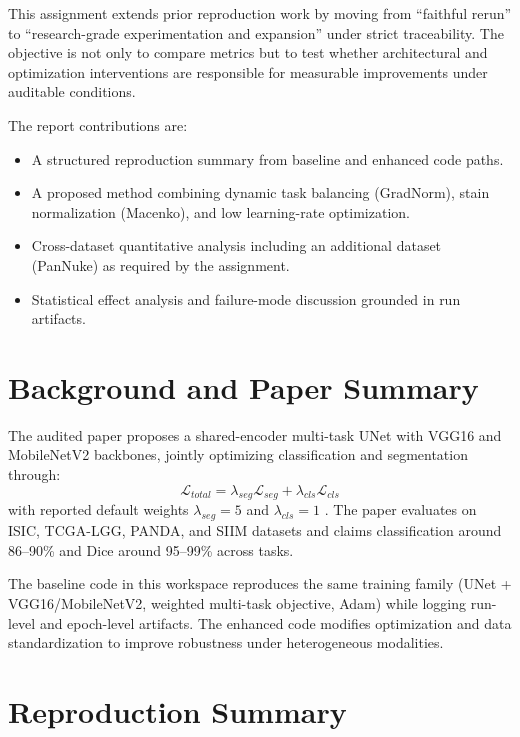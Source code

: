 \documentclass[conference]{IEEEtran}
\begin{document}
This assignment extends prior reproduction work by moving from ``faithful rerun'' to ``research-grade experimentation and expansion'' under strict traceability. The objective is not only to compare metrics but to test whether architectural and optimization interventions are responsible for measurable improvements under auditable conditions.

The report contributions are:
\begin{itemize}
\item A structured reproduction summary from baseline and enhanced code paths.
\item A proposed method combining dynamic task balancing (GradNorm), stain normalization (Macenko), and low learning-rate optimization.
\item Cross-dataset quantitative analysis including an additional dataset (PanNuke) as required by the assignment.
\item Statistical effect analysis and failure-mode discussion grounded in run artifacts.
\end{itemize}

\section{Background and Paper Summary}
The audited paper proposes a shared-encoder multi-task UNet with VGG16 and MobileNetV2 backbones, jointly optimizing classification and segmentation through:
\begin{equation}
\mathcal{L}_{total}=\lambda_{seg}\mathcal{L}_{seg}+\lambda_{cls}\mathcal{L}_{cls}
\end{equation}
with reported default weights $\lambda_{seg}=5$ and $\lambda_{cls}=1$ \cite{b3}. The paper evaluates on ISIC, TCGA-LGG, PANDA, and SIIM datasets and claims classification around 86--90\% and Dice around 95--99\% across tasks.

The baseline code in this workspace reproduces the same training family (UNet + VGG16/MobileNetV2, weighted multi-task objective, Adam) while logging run-level and epoch-level artifacts. The enhanced code modifies optimization and data standardization to improve robustness under heterogeneous modalities.

\section{Reproduction Summary}
\end{document}
